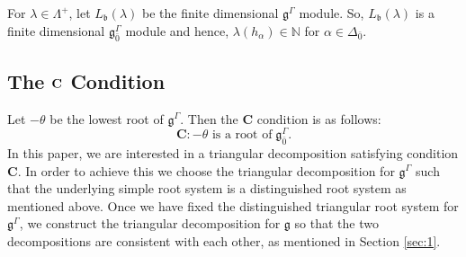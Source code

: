 \documentclass[11pt]{amsart}
\theoremstyle{plain}
\theoremstyle{definition}
\newcommand{\g}{\mathfrak{g}}
\begin{document}
 For $\lambda\in\Lambda^{+}$, let $L_{\mathfrak{b}}(\lambda)$ be the finite dimensional $\g^{\Gamma}$ module. So, $L_{\mathfrak{b}}(\lambda)$ is a finite dimensional $\g_{\bar{0}}^{\Gamma}$ module and hence, $\lambda(h_{\alpha})\in\mathbb{N}$ for $\alpha\in\Delta_{\bar{0}}$.
\subsection{The ${\bf C}$ Condition}
 Let $-\theta$ be the lowest root of $\g^{\Gamma}$. Then the $\mathbf{C}$ condition is as follows:
 \[\mathbf{C}:-\theta \mbox{ is a root of} \;\g_{\bar{0}}^{\Gamma}.\]
  In this paper, we are interested in a triangular decomposition satisfying condition $\mathbf{C}$.
 In order to achieve this we choose the triangular decomposition for $\g^{\Gamma}$ such that the underlying simple root system is a distinguished root system as mentioned above. Once we have fixed the distinguished triangular root system for $\g^{\Gamma}$, we construct the triangular decomposition for $\g$ so that the two decompositions are consistent with each other, as mentioned in Section \ref{sec:1}.
\end{document}
